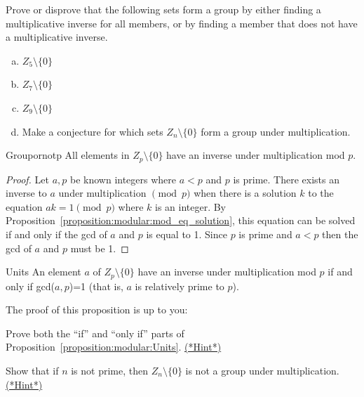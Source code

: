 \begin{exercise}{90}
Prove or disprove that the following sets form a group by either finding a multiplicative inverse for all members, or by finding a member that does not have a multiplicative inverse.
\begin{enumerate}[(a)]
\item
$Z_5\setminus \{0\}$
\item
$Z_7\setminus \{0\}$
\item
$Z_9\setminus \{0\}$
\item
Make a conjecture for which sets $Z_n \setminus \{0\}$ form a group under multiplication.
\end{enumerate}
\end{exercise}


\begin{prop}{Groupornotp}
All elements in $Z_p \setminus \{0\}$ have an inverse under multiplication mod $p$. 
\end{prop}
\begin{proof}
Let $a,p$ be known integers where $a < p$ and $p$ is prime.  There exists an inverse to $a$ under multiplication $\pmod p$ when there is a solution $k$  to the equation $ak = 1 \pmod p$ where $k$ is an integer.  By Proposition~\ref{proposition:modular:mod_eq_solution}, this equation can be solved if and only if the gcd of $a$ and $p$ is equal to 1.  Since $p$ is prime and $a<p$ then the gcd of $a$ and $p$ must be 1.
\end{proof}

\begin{prop}{Units}
An element $a$ of  $Z_p \setminus \{0\}$ have an inverse under multiplication mod $p$ if and only if gcd($a,p$)=1  (that is, $a$ is relatively prime to $p$).
\end{prop}
The proof of this proposition is up to you:

\begin{exercise}{93}
Prove both the ``if'' and ``only if'' parts of Proposition~\ref{proposition:modular:Units}.
\hyperref[sec:modular_arithmetic:hints]{(*Hint*)}
\end{exercise}

\begin{exercise}{94}
Show that if $n$ is not prime, then $Z_n\setminus \{0\}$ is not a group under multiplication.
\hyperref[sec:modular_arithmetic:hints]{(*Hint*)}
\end{exercise}

